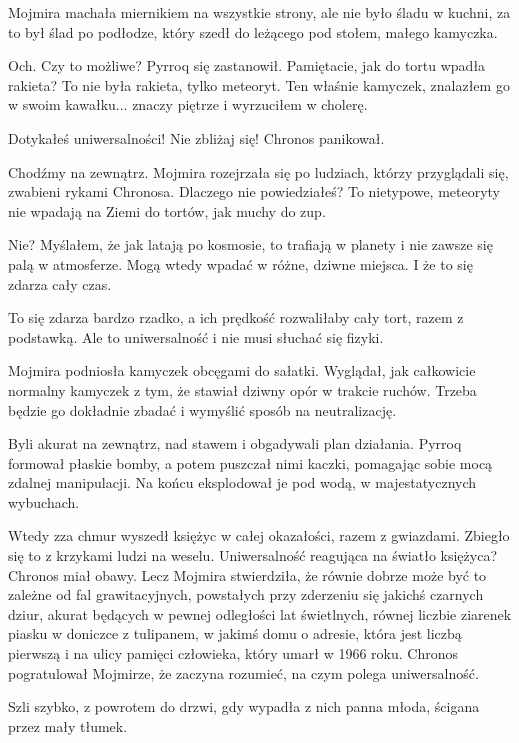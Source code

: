 Mojmira machała miernikiem na wszystkie strony, ale nie było śladu w kuchni, za to był ślad po podłodze, który szedł do leżącego pod stołem, małego kamyczka.

\ds{} Och. Czy to możliwe? \dm{} Pyrroq się zastanowił. \dm{} Pamiętacie, jak do tortu wpadła rakieta? To nie była rakieta, tylko meteoryt. 
Ten właśnie kamyczek, znalazłem go w swoim kawałku... znaczy piętrze i wyrzuciłem w cholerę. \de{}

\ds{} Dotykałeś uniwersalności! Nie zbliżaj się! \dm{} Chronos panikował. \de{}

\ds{} Chodźmy na zewnątrz. \dm{} Mojmira rozejrzała się po ludziach, którzy przyglądali się, zwabieni rykami Chronosa. \dm{} 
Dlaczego nie powiedziałeś? To nietypowe, meteoryty nie wpadają na Ziemi do tortów, jak muchy do zup. \de{}

\ds{} Nie? Myślałem, że jak latają po kosmosie, to trafiają w planety i nie zawsze się palą w atmosferze. Mogą wtedy wpadać w różne, dziwne miejsca. 
I że to się zdarza cały czas. \de{}

\ds{} To się zdarza bardzo rzadko, a ich prędkość rozwaliłaby cały tort, razem z podstawką. Ale to uniwersalność i nie musi słuchać się fizyki. 

Mojmira podniosła kamyczek obcęgami do sałatki. 
Wyglądał, jak całkowicie normalny kamyczek z tym, że stawiał dziwny opór w trakcie ruchów.
Trzeba będzie go dokładnie zbadać i wymyślić sposób na neutralizację.

\divider{}

Byli akurat na zewnątrz, nad stawem i obgadywali plan działania. 
Pyrroq formował płaskie bomby, a potem puszczał nimi kaczki, pomagając sobie mocą zdalnej manipulacji.
Na końcu eksplodował je pod wodą, w majestatycznych wybuchach.

Wtedy zza chmur wyszedł księżyc w całej okazałości, razem z gwiazdami.
Zbiegło się to z krzykami ludzi na weselu. 
Uniwersalność reagująca na światło księżyca? Chronos miał obawy.
Lecz Mojmira stwierdziła, że równie dobrze może być to zależne od fal grawitacyjnych, powstałych przy zderzeniu się jakichś czarnych dziur, akurat będących 
w pewnej odległości lat świetlnych, równej liczbie ziarenek piasku w doniczce z 
tulipanem, w jakimś domu o adresie, która jest liczbą pierwszą i na ulicy pamięci człowieka, który umarł w 1966 roku.
Chronos pogratulował Mojmirze, że zaczyna rozumieć, na czym polega uniwersalność.

Szli szybko, z powrotem do drzwi, gdy wypadła z nich panna młoda, ścigana przez mały tłumek.

